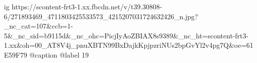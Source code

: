  
 
 
 
 

\ifcmt
  ig https://scontent-frt3-1.xx.fbcdn.net/v/t39.30808-6/271893469_4711803425533573_4215207031724632426_n.jpg?_nc_cat=107&ccb=1-5&_nc_sid=b9115d&_nc_ohc=PicjIyAoZBIAX8s9389&_nc_ht=scontent-frt3-1.xx&oh=00_AT8V4j_pnuXBTN99BxDajkKpjpzriNUs2bpGvYl2v4pg7Q&oe=61E59F79
  @caption @label 19
\fi
